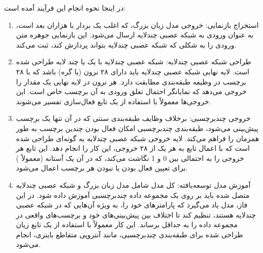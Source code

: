 در اینجا نحوه انجام این فرآیند آمده است:
\begin{enumerate}
	\item
	      استخراج بازنمایی: خروجی مدل زبان بزرگ، که اغلب یک بردار با هزاران بعد است، به عنوان ورودی به شبکه عصبی چندلایه ارسال می‌شود. این بازنمایی جوهره متن ورودی را به شکلی که شبکه عصبی چندلایه بتواند پردازش کند، ثبت می‌کند.
	\item
	      طراحی شبکه عصبی چندلایه: شبکه عصبی چندلایه با یک یا چند لایه طراحی شده است. لایه نهایی شبکه عصبی چندلایه باید دارای ۲۸ نرون (یا گره) باشد که با ۲۸ برچسب در وظیفه طبقه‌بندی مطابقت دارد. هر نرون در لایه نهایی یک مقدار را خروجی می‌دهد که نمایانگر احتمال تعلق ورودی به آن برچسب خاص است. این خروجی‌ها معمولاً با استفاده از یک تابع فعال‌سازی  تفسیر می‌شوند.

	\item
	      خروجی چند‌برچسبی: برخلاف وظایف طبقه‌بندی سنتی که در آن تنها یک برچسب پیش‌بینی می‌شود، طبقه‌بندی چند‌برچسبی امکان فعال بودن چندین برچسب به طور همزمان را فراهم می‌کند. لایه خروجی شبکه عصبی چندلایه به گونه‌ای طراحی شده است که با اعمال تابع  به هر یک از ۲۸ خروجی، این کار را انجام دهد. این تابع هر خروجی را به احتمالی بین 0 و 1 نگاشت می‌کند، که در آن یک آستانه (معمولاً ) برای تعیین فعال بودن یا نبودن هر برچسب اعمال می‌شود.

	\item
	      آموزش مدل توسعه‌یافته: کل مدل شامل مدل زبان بزرگ و شبکه عصبی چندلایه متصل شده باید بر روی یک مجموعه داده چندبرچسبی آموزش داده شود. در این فاز، مدل یاد می‌گیرد که پارامترهای خود را، به ویژه آن‌هایی که در شبکه عصبی چندلایه هستند، تنظیم کند تا اختلاف بین پیش‌بینی‌های خود و برچسب‌های واقعی در مجموعه داده را به حداقل برساند. این کار معمولاً با استفاده از یک تابع زیان طراحی شده برای طبقه‌بندی چندبرچسبی، مانند آنتروپی متقاطع باینری، انجام می‌شود.
\end{enumerate}

